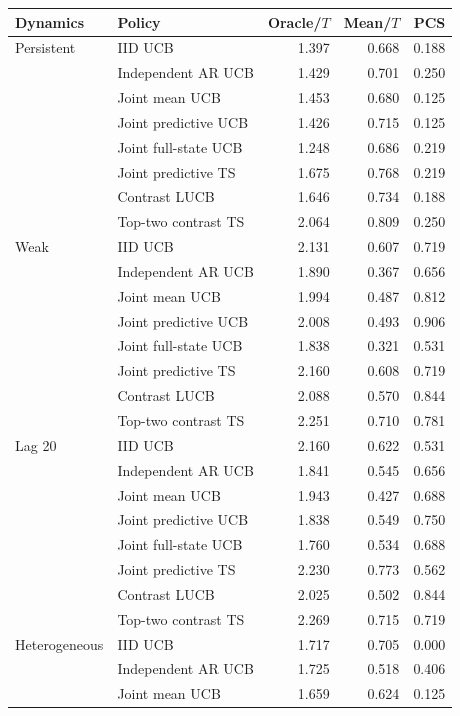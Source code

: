 \begin{table}[p]
\centering\scriptsize

\begin{tabular}{llrrr}
\toprule
Dynamics & Policy & Oracle/$T$ & Mean/$T$ & PCS\\
\midrule
Persistent & IID UCB & 1.397 & 0.668 & 0.188\\
 & Independent AR UCB & 1.429 & 0.701 & 0.250\\
 & Joint mean UCB & 1.453 & 0.680 & 0.125\\
 & Joint predictive UCB & 1.426 & 0.715 & 0.125\\
 & Joint full-state UCB & 1.248 & 0.686 & 0.219\\
 & Joint predictive TS & 1.675 & 0.768 & 0.219\\
 & Contrast LUCB & 1.646 & 0.734 & 0.188\\
 & Top-two contrast TS & 2.064 & 0.809 & 0.250\\
\midrule
Weak & IID UCB & 2.131 & 0.607 & 0.719\\
 & Independent AR UCB & 1.890 & 0.367 & 0.656\\
 & Joint mean UCB & 1.994 & 0.487 & 0.812\\
 & Joint predictive UCB & 2.008 & 0.493 & 0.906\\
 & Joint full-state UCB & 1.838 & 0.321 & 0.531\\
 & Joint predictive TS & 2.160 & 0.608 & 0.719\\
 & Contrast LUCB & 2.088 & 0.570 & 0.844\\
 & Top-two contrast TS & 2.251 & 0.710 & 0.781\\
\midrule
Lag 20 & IID UCB & 2.160 & 0.622 & 0.531\\
 & Independent AR UCB & 1.841 & 0.545 & 0.656\\
 & Joint mean UCB & 1.943 & 0.427 & 0.688\\
 & Joint predictive UCB & 1.838 & 0.549 & 0.750\\
 & Joint full-state UCB & 1.760 & 0.534 & 0.688\\
 & Joint predictive TS & 2.230 & 0.773 & 0.562\\
 & Contrast LUCB & 2.025 & 0.502 & 0.844\\
 & Top-two contrast TS & 2.269 & 0.715 & 0.719\\
\midrule
Heterogeneous & IID UCB & 1.717 & 0.705 & 0.000\\
 & Independent AR UCB & 1.725 & 0.518 & 0.406\\
 & Joint mean UCB & 1.659 & 0.624 & 0.125\\

\end{tabular}
\end{table}
